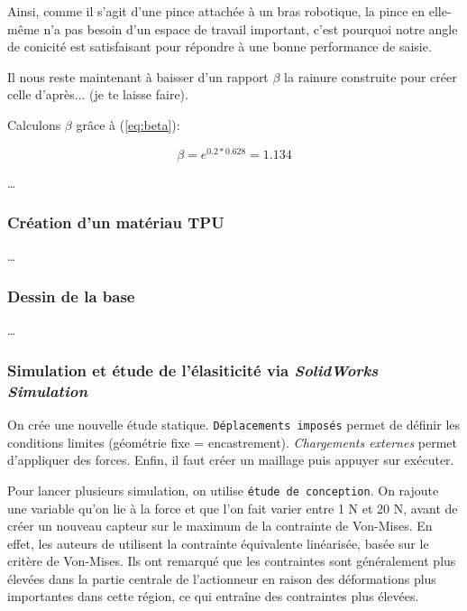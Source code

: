\documentclass[a4paper, 11pt]{report}
\begin{document}
            Ainsi, comme il s'agit d'une pince attachée à un bras robotique, la pince en elle-même n'a pas besoin d'un espace de travail important, c'est pourquoi notre angle de conicité est satisfaisant pour répondre à une bonne performance de saisie.

            Il nous reste maintenant à baisser d'un rapport $\beta$ la rainure construite pour créer celle d'après... (je te laisse faire).
            
            Calculons $\beta$ grâce à (\ref{eq:beta}):

            \[
            \beta = e^{0.2 * 0.628} = 1.134
            \]

            \dots

        \subsubsection{Création d'un matériau TPU}

            \dots

        \subsubsection{Dessin de la base}

            \dots

        \subsubsection{Simulation et étude de l'élasiticité via \textit{SolidWorks Simulation}}

            On crée une nouvelle étude statique. \texttt{Déplacements imposés} permet de définir les conditions limites (géométrie fixe = encastrement). \textit{Chargements externes} permet d'appliquer des forces. Enfin, il faut créer un maillage puis appuyer sur exécuter.

            Pour lancer plusieurs simulation, on utilise \texttt{étude de conception}. On rajoute une variable qu'on lie à la force et que l'on fait varier entre 1 N et 20 N, avant de créer un nouveau capteur sur le maximum de la contrainte de Von-Mises. En effet, les auteurs de \cite{bhat_numerical_2025} utilisent la contrainte équivalente linéarisée, basée sur le critère de Von-Mises. Ils ont remarqué que les contraintes sont généralement plus élevées dans la partie centrale de l'actionneur en raison des déformations plus importantes dans cette région, ce qui entraîne des contraintes plus élevées.
        
    
    
\end{document}
